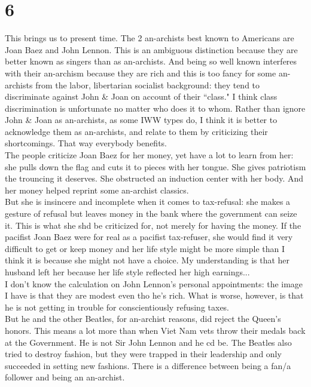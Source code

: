 \documentclass[12pt, onecolumn, letterpaper, oneside]{book}
\begin{document}
\section*{6}
This brings us to present time. The 2 an-archists best known to Americans are Joan Baez and John Lennon. This is an ambiguous distinction because they are better known as singers than as an-archists. And being so well known interferes with their an-archism because they are rich and this is too fancy for some an-archists from the labor, libertarian socialist background: they tend to discriminate against John \& Joan on account of their ``class." I think class discrimination is unfortunate no matter who does it to whom. Rather than ignore John \& Joan as an-archists, as some IWW types do, I think it is better to acknowledge them as an-archists, and relate to them by criticizing their shortcomings. That way everybody benefits.\\
The people criticize Joan Baez for her money, yet have a lot to learn from her: she pulls down the flag and cuts it to pieces with her tongue. She gives patriotism the trouncing it deserves. She obstructed an induction center with her body. And her money helped reprint some an-archist classics.\\
But she is insincere and incomplete when it comes to tax-refusal: she makes a gesture of refusal but leaves money in the bank where the government can seize it. This is what she shd be criticized for, not merely for having the money. If the pacifist Joan Baez were for real as a pacifist tax-refuser, she would find it very difficult to get or keep money and her life style might be more simple than I think it is because she might not have a choice. My understanding is that her husband left her because her life style reflected her high earnings...\\
I don't know the calculation on John Lennon's personal appointments: the image I have is that they are modest even tho he's rich. What is worse, however, is that he is not getting in trouble for conscientiously refusing taxes.\\
But he and the other Beatles, for an-archist reasons, did reject the Queen's honors. This means a lot more than when Viet Nam vets throw their medals back at the Government. He is not Sir John Lennon and he cd be. The Beatles also tried to destroy fashion, but they were trapped in their leadership and only succeeded in setting new fashions. There is a difference between being a fan/a follower and being an an-archist.\\
\end{document}
